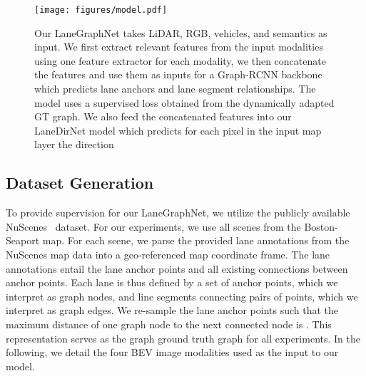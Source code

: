 \documentclass[letterpaper, 10 pt, conference]{ieeeconf}
\begin{document}
\begin{figure*}
\centering
\texttt{[image: figures/model.pdf]}
\caption{Our LaneGraphNet takes LiDAR, RGB, vehicles, and semantics as input. We first extract relevant features from the input modalities using one feature extractor for each modality, we then concatenate the features and use them as inputs for a Graph-RCNN backbone which predicts lane anchors and lane segment relationships. The model uses a supervised loss obtained from the dynamically adapted GT graph. We also feed the concatenated features into our LaneDirNet model which predicts for each pixel in the input map layer the direction}
\label{fig:approach}
\end{figure*}






\subsection{Dataset Generation}


To provide supervision for our LaneGraphNet, we utilize the publicly available NuScenes~\cite{caesar2020nuscenes} dataset. For our experiments, we use all scenes from the Boston-Seaport map. For each scene, we parse the provided lane annotations from the NuScenes map data into a geo-referenced map coordinate frame. The lane annotations entail the lane anchor points and all existing connections between anchor points. Each lane is thus defined by a set of anchor points, which we interpret as graph nodes, and line segments connecting pairs of points, which we interpret as graph edges. We re-sample the lane anchor points such that the maximum distance of one graph node to the next connected node is . This representation serves as the graph ground truth graph for all experiments. In the following, we detail the four BEV image modalities used as the input to our model.
\end{document}
